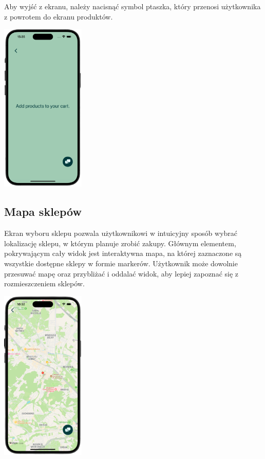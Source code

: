Aby wyjść z ekranu, należy nacisnąć symbol ptaszka, który przenosi użytkownika z powrotem do ekranu produktów.

\begin{center}
    \includegraphics[width=0.3\textwidth]{images/front/qr_empty.png}
\end{center}

\subsection{Mapa sklepów}

Ekran wyboru sklepu pozwala użytkownikowi w intuicyjny sposób wybrać lokalizację sklepu, w którym planuje zrobić zakupy. Głównym elementem, pokrywającym cały widok jest interaktywna mapa, na której zaznaczone są wszystkie dostępne sklepy w formie markerów. Użytkownik może dowolnie przesuwać mapę oraz przybliżać i oddalać widok, aby lepiej zapoznać się z rozmieszczeniem sklepów. 

\begin{center}
\includegraphics[width=0.3\textwidth]{images/front/store_page.png}
\end{center}

